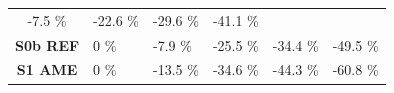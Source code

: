 \documentclass[]{article}
\begin{document}
\begin{longtable}[]{@{}clllll@{}}
\begin{minipage}[t]{0.13\columnwidth}
-7.5 \%\strut
\end{minipage} & \begin{minipage}[t]{0.13\columnwidth}\raggedright\strut
-22.6 \%\strut
\end{minipage} & \begin{minipage}[t]{0.13\columnwidth}\raggedright\strut
-29.6 \%\strut
\end{minipage} & \begin{minipage}[t]{0.13\columnwidth}\raggedright\strut
-41.1 \%\strut
\end{minipage}\tabularnewline
\begin{minipage}[t]{0.18\columnwidth}\centering\strut
\textbf{S0b REF}\strut
\end{minipage} & \begin{minipage}[t]{0.13\columnwidth}\raggedright\strut
0 \%\strut
\end{minipage} & \begin{minipage}[t]{0.13\columnwidth}\raggedright\strut
-7.9 \%\strut
\end{minipage} & \begin{minipage}[t]{0.13\columnwidth}\raggedright\strut
-25.5 \%\strut
\end{minipage} & \begin{minipage}[t]{0.13\columnwidth}\raggedright\strut
-34.4 \%\strut
\end{minipage} & \begin{minipage}[t]{0.13\columnwidth}\raggedright\strut
-49.5 \%\strut
\end{minipage}\tabularnewline
\begin{minipage}[t]{0.18\columnwidth}\centering\strut
\textbf{S1 AME}\strut
\end{minipage} & \begin{minipage}[t]{0.13\columnwidth}\raggedright\strut
0 \%\strut
\end{minipage} & \begin{minipage}[t]{0.13\columnwidth}\raggedright\strut
-13.5 \%\strut
\end{minipage} & \begin{minipage}[t]{0.13\columnwidth}\raggedright\strut
-34.6 \%\strut
\end{minipage} & \begin{minipage}[t]{0.13\columnwidth}\raggedright\strut
-44.3 \%\strut
\end{minipage} & \begin{minipage}[t]{0.13\columnwidth}\raggedright\strut
-60.8 \%\strut
\end{minipage}\tabularnewline

\end{longtable}
\end{document}
